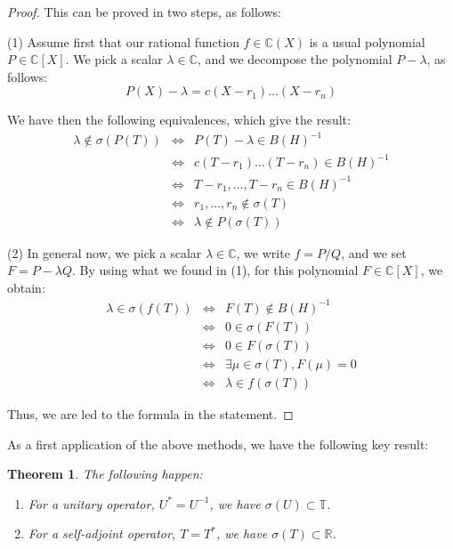 \documentclass[12pt]{amsbook}
\newtheorem{theorem}{Theorem}[chapter]
\begin{document}
\begin{proof}
This can be proved in two steps, as follows:

\medskip

(1) Assume first that our rational function $f\in\mathbb C(X)$ is a usual polynomial $P\in\mathbb C[X]$. We pick a scalar $\lambda\in\mathbb C$, and we decompose the polynomial $P-\lambda$, as follows:
$$P(X)-\lambda=c(X-r_1)\ldots(X-r_n)$$

We have then the following equivalences, which give the result:
\begin{eqnarray*}
\lambda\notin\sigma(P(T))
&\iff&P(T)-\lambda\in B(H)^{-1}\\
&\iff&c(T-r_1)\ldots(T-r_n)\in B(H)^{-1}\\
&\iff&T-r_1,\ldots,T-r_n\in B(H)^{-1}\\
&\iff&r_1,\ldots,r_n\notin\sigma(T)\\
&\iff&\lambda\notin P(\sigma(T))
\end{eqnarray*}

(2) In general now, we pick a scalar $\lambda\in\mathbb C$, we write $f=P/Q$, and we set $F=P-\lambda Q$. By using what we found in (1), for this polynomial $F\in\mathbb C[X]$, we obtain:
\begin{eqnarray*}
\lambda\in\sigma(f(T))
&\iff&F(T)\notin B(H)^{-1}\\
&\iff&0\in\sigma(F(T))\\
&\iff&0\in F(\sigma(T))\\
&\iff&\exists\mu\in\sigma(T),F(\mu)=0\\
&\iff&\lambda\in f(\sigma(T))
\end{eqnarray*}

Thus, we are led to the formula in the statement.
\end{proof}

As a first application of the above methods, we have the following key result:

\begin{theorem}
The following happen:
\begin{enumerate}
\item For a unitary operator, $U^*=U^{-1}$, we have $\sigma(U)\subset\mathbb T$. 

\item For a self-adjoint operator, $T=T^*$, we have $\sigma(T)\subset\mathbb R$.
\end{enumerate}
\end{theorem}
\end{document}
